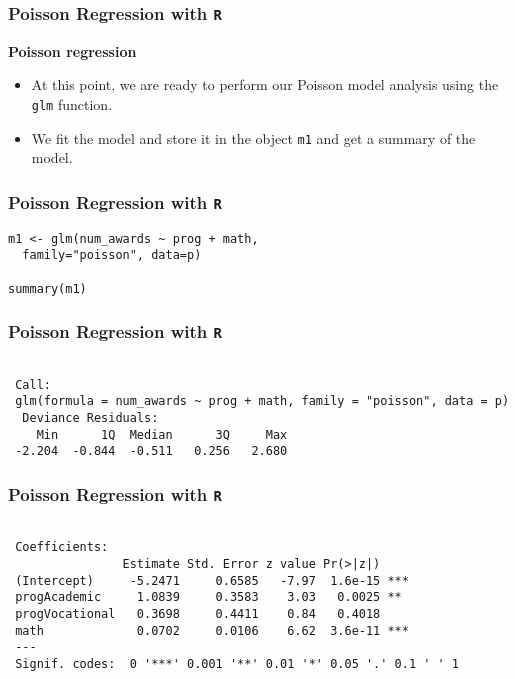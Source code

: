 \documentclass[00-GLMregslides.tex]{subfiles}
\begin{document}
\begin{frame}[fragile]

\frametitle{Poisson Regression with \texttt{R}}
\Large
 
\textbf{Poisson regression}
 \begin{itemize}
\item At this point, we are ready to perform our Poisson model analysis using the \texttt{glm} function. 
\item We fit the model and store it in the object \texttt{m1} and get a summary of the model.
\end{itemize}
\end{frame}

\begin{frame}[fragile]

\frametitle{Poisson Regression with \texttt{R}}
\large
\begin{framed}
	\begin{verbatim}
m1 <- glm(num_awards ~ prog + math, 
  family="poisson", data=p)

summary(m1)
\end{verbatim}
\end{framed}
\end{frame}
 \begin{frame}[fragile]
\frametitle{Poisson Regression with \texttt{R}}
\large
\begin{framed}
\begin{verbatim}

 Call:
 glm(formula = num_awards ~ prog + math, family = "poisson", data = p)
  Deviance Residuals: 
    Min      1Q  Median      3Q     Max  
 -2.204  -0.844  -0.511   0.256   2.680  
 \end{verbatim}
\end{framed}
\end{frame}

\begin{frame}[fragile]

\frametitle{Poisson Regression with \texttt{R}}
\large
\begin{framed}
\begin{verbatim}

 Coefficients:
                Estimate Std. Error z value Pr(>|z|)    
 (Intercept)     -5.2471     0.6585   -7.97  1.6e-15 ***
 progAcademic     1.0839     0.3583    3.03   0.0025 ** 
 progVocational   0.3698     0.4411    0.84   0.4018    
 math             0.0702     0.0106    6.62  3.6e-11 ***
 ---
 Signif. codes:  0 '***' 0.001 '**' 0.01 '*' 0.05 '.' 0.1 ' ' 1
 
\end{verbatim}
\end{framed}
\end{frame}
\end{document}

